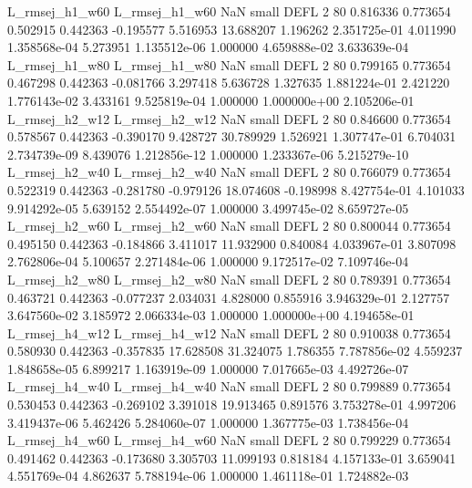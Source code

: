 L_rmsej_h1_w60 L_rmsej_h1_w60                   NaN      small     DEFL                 2 80 0.816336       0.773654 0.502915       0.442363   -0.195577      5.516953     13.688207     1.196262   2.351725e-01  4.011990 1.358568e-04     5.273951   1.135512e-06            1.000000    4.659888e-02        3.633639e-04
L_rmsej_h1_w80 L_rmsej_h1_w80                   NaN      small     DEFL                 2 80 0.799165       0.773654 0.467298       0.442363   -0.081766      3.297418      5.636728     1.327635   1.881224e-01  2.421220 1.776143e-02     3.433161   9.525819e-04            1.000000    1.000000e+00        2.105206e-01
L_rmsej_h2_w12 L_rmsej_h2_w12                   NaN      small     DEFL                 2 80 0.846600       0.773654 0.578567       0.442363   -0.390170      9.428727     30.789929     1.526921   1.307747e-01  6.704031 2.734739e-09     8.439076   1.212856e-12            1.000000    1.233367e-06        5.215279e-10
L_rmsej_h2_w40 L_rmsej_h2_w40                   NaN      small     DEFL                 2 80 0.766079       0.773654 0.522319       0.442363   -0.281780     -0.979126     18.074608    -0.198998   8.427754e-01  4.101033 9.914292e-05     5.639152   2.554492e-07            1.000000    3.499745e-02        8.659727e-05
L_rmsej_h2_w60 L_rmsej_h2_w60                   NaN      small     DEFL                 2 80 0.800044       0.773654 0.495150       0.442363   -0.184866      3.411017     11.932900     0.840084   4.033967e-01  3.807098 2.762806e-04     5.100657   2.271484e-06            1.000000    9.172517e-02        7.109746e-04
L_rmsej_h2_w80 L_rmsej_h2_w80                   NaN      small     DEFL                 2 80 0.789391       0.773654 0.463721       0.442363   -0.077237      2.034031      4.828000     0.855916   3.946329e-01  2.127757 3.647560e-02     3.185972   2.066334e-03            1.000000    1.000000e+00        4.194658e-01
L_rmsej_h4_w12 L_rmsej_h4_w12                   NaN      small     DEFL                 2 80 0.910038       0.773654 0.580930       0.442363   -0.357835     17.628508     31.324075     1.786355   7.787856e-02  4.559237 1.848658e-05     6.899217   1.163919e-09            1.000000    7.017665e-03        4.492726e-07
L_rmsej_h4_w40 L_rmsej_h4_w40                   NaN      small     DEFL                 2 80 0.799889       0.773654 0.530453       0.442363   -0.269102      3.391018     19.913465     0.891576   3.753278e-01  4.997206 3.419437e-06     5.462426   5.284060e-07            1.000000    1.367775e-03        1.738456e-04
L_rmsej_h4_w60 L_rmsej_h4_w60                   NaN      small     DEFL                 2 80 0.799229       0.773654 0.491462       0.442363   -0.173680      3.305703     11.099193     0.818184   4.157133e-01  3.659041 4.551769e-04     4.862637   5.788194e-06            1.000000    1.461118e-01        1.724882e-03
